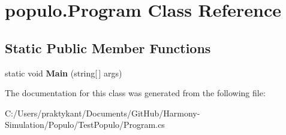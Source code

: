 \hypertarget{classpopulo_1_1_program}{\section{populo.\+Program Class Reference}
\label{classpopulo_1_1_program}
}
\subsection*{Static Public Member Functions}
\begin{DoxyCompactItemize}
\item 
\hypertarget{classpopulo_1_1_program_a3e97a9050cf639b4eb65a13d17b7913f}{static void {\bfseries Main} (string\mbox{[}$\,$\mbox{]} args)}\label{classpopulo_1_1_program_a3e97a9050cf639b4eb65a13d17b7913f}

\end{DoxyCompactItemize}


The documentation for this class was generated from the following file\+:\begin{DoxyCompactItemize}
\item 
C\+:/\+Users/praktykant/\+Documents/\+Git\+Hub/\+Harmony-\/\+Simulation/\+Populo/\+Test\+Populo/Program.\+cs\end{DoxyCompactItemize}

